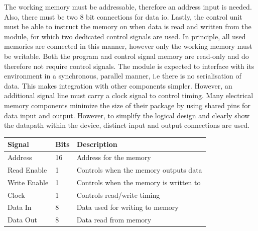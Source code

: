 The working memory must be addressable, therefore an address input is needed. Also, there must be two 8 bit connections for data \ac{io}. Lastly, the control unit must be able to instruct the memory on when data is read and written from the module, for which two dedicated control signals are used. In principle, all used memories are connected in this manner, however only the working memory must be writable. Both the program and control signal memory are read-only and do therefore not require control signals. The module is expected to interface with its environment in a synchronous, parallel manner, i.e there is no serialisation of data. This makes integration with other components simpler. However, an additional signal line must carry a clock signal to control timing. Many electrical memory components minimize the size of their package by using shared pins for data input and output. However, to simplify the logical design and clearly show the datapath within the device, distinct input and output connections are used.

\begin{table}[H]
    \centering
    \begin{tabular}{|l|l|l|} 
        \hline
        \textbf{\textbf{Signal}} & \textbf{Bits} & \textbf{Description}                    \\ 
        \hline
        Address                  & 16            & Address for the memory                  \\ 
        \hline
        Read Enable              & 1             & Controls when the memory outputs data   \\ 
        \hline
        Write Enable             & 1             & Controls when the memory is written to  \\ 
        \hline
        Clock                    & 1             & Controls read/write timing              \\ 
        \hline
        Data In                  & 8             & Data used for writing to memory         \\ 
        \hline
        Data Out                 & 8             & Data read from memory                   \\
        \hline
    \end{tabular}
    \label{tab:implementation_logical_memory_io}
\end{table}

